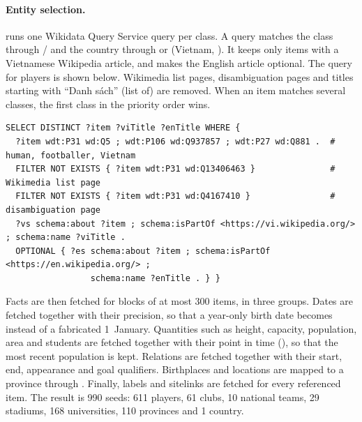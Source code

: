 \paragraph{Entity selection.}  runs one Wikidata Query Service
query per class. A query matches the class through / and
the country through  or  (Vietnam, ). It keeps
only items with a Vietnamese Wikipedia article, and makes the English article
optional. The query for players is shown below. Wikimedia list pages,
disambiguation pages and titles starting with ``Danh sách'' (list of) are
removed. When an item matches several classes, the first class in the
priority order wins.
\begin{Verbatim}
SELECT DISTINCT ?item ?viTitle ?enTitle WHERE {
  ?item wdt:P31 wd:Q5 ; wdt:P106 wd:Q937857 ; wdt:P27 wd:Q881 .  # human, footballer, Vietnam
  FILTER NOT EXISTS { ?item wdt:P31 wd:Q13406463 }               # Wikimedia list page
  FILTER NOT EXISTS { ?item wdt:P31 wd:Q4167410 }                # disambiguation page
  ?vs schema:about ?item ; schema:isPartOf <https://vi.wikipedia.org/> ; schema:name ?viTitle .
  OPTIONAL { ?es schema:about ?item ; schema:isPartOf <https://en.wikipedia.org/> ;
                 schema:name ?enTitle . } }
\end{Verbatim}
Facts are then fetched for blocks of at most 300 items, in three groups. Dates
are fetched together with their precision, so that a year-only birth date
becomes  instead of a fabricated 1~January. Quantities such as
height, capacity, population, area and students are fetched together with
their point in time (), so that the most recent population is
kept. Relations are fetched together with their start, end, appearance and
goal qualifiers. Birthplaces and locations are mapped to a province through
. Finally, labels and sitelinks are fetched for every referenced
item. The result is 990 seeds: 611 players, 61 clubs, 10 national teams,
29 stadiums, 168 universities, 110 provinces and 1 country.

